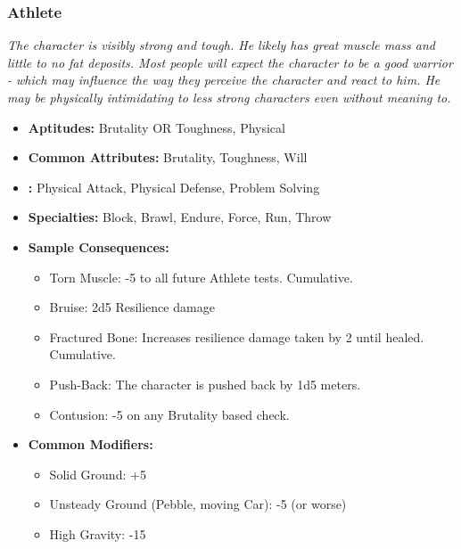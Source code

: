 	\subsubsection{Athlete}\label{Athlete}
		\textit{The character is visibly strong and tough.
		He likely has great muscle mass and little to no fat deposits.
		Most people will expect the character to be a good warrior - which may influence the way they perceive the character and react to him.
		He may be physically intimidating to less strong characters even without meaning to.}
		\begin{itemize}
			\item \textbf{Aptitudes:} Brutality OR Toughness, Physical
			\item \textbf{Common Attributes:} Brutality, Toughness, Will
			\item \textbf{:} Physical Attack, Physical Defense, Problem Solving
			\item \textbf{Specialties:} Block, Brawl, Endure, Force, Run, Throw
			\item \textbf{Sample Consequences:} 
			\begin{itemize}
				\item Torn Muscle: -5 to all future Athlete tests. Cumulative.
				\item Bruise: 2d5 Resilience damage
				\item Fractured Bone: Increases resilience damage taken by 2 until healed. Cumulative.
				\item Push-Back: The character is pushed back by 1d5 meters.
				\item Contusion: -5 on any Brutality based check.
			\end{itemize}
			\item \textbf{Common Modifiers:}
			\begin{itemize}
				\item Solid Ground: +5
				\item Unsteady Ground (Pebble, moving Car): -5 (or worse)
				\item High Gravity: -15
			\end{itemize}
		\end{itemize}

